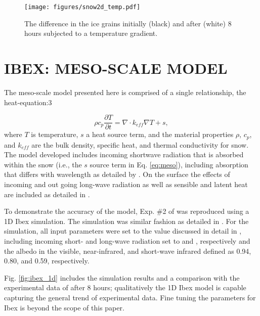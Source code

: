 \begin{figure}
  \texttt{[image: figures/snow2d\_temp.pdf]}
  \caption{The difference in the ice grains initially (black) and after (white) 8 hours subjected to a  temperature gradient.}
  \label{fig:snow2d:grains}
\end{figure}

\section{IBEX: MESO-SCALE MODEL}\label{sec:ibex}
The meso-scale model presented here is comprised of a single relationship, the heat-equation:3

\begin{equation}\label{eq:meso}
\rho c_p \frac{\partial{T}}{\partial t} = \nabla \cdot k_{eff} \nabla T + s,
\end{equation}
where $T$ is temperature, $s$ a heat source term, and the material properties $\rho$, $c_p$, and $k_{eff}$ are the bulk density, specific heat, and thermal conductivity for snow. The model developed includes incoming shortwave radiation that is absorbed within the snow (i.e., the $s$ source term in Eq. \eqref{eq:meso}), including absorption that differs with wavelength as detailed by \citet[][Ch. 4]{slaughter2010numerical}. On the surface the effects of incoming and out going long-wave radiation as well as sensible and latent heat are included as detailed in \citet{morstad2007experimental}.

To demonstrate the accuracy of the model, Exp. \#2 of \citet{morstad2007experimental} was reproduced using a 1D Ibex simulation. The simulation was similar fashion as detailed in \citet[][Ch. 4]{slaughter2010numerical}. For the simulation, all input parameters were set to the value discussed in detail in \citet{slaughter2010numerical}, including incoming short- and long-wave radiation set to  and , respectively and the albedo in the visible, near-infrared, and short-wave infrared defined as 0.94, 0.80, and 0.59, respectively.

Fig. \ref{fig:ibex_1d} includes the simulation results and a comparison with the experimental data of \citet{morstad2007experimental} after 8 hours; qualitatively the 1D Ibex model is capable capturing the general trend of experimental data. Fine tuning the parameters for Ibex is beyond the scope of this paper.

